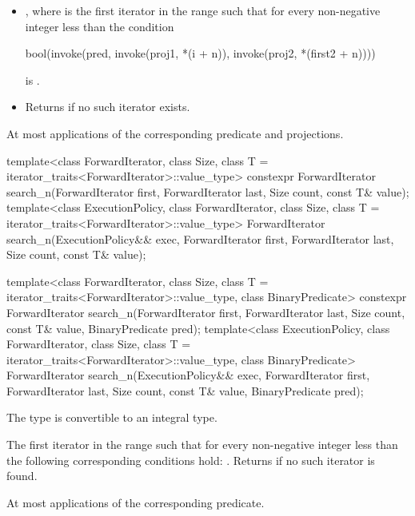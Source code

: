\begin{itemdescr}
\pnum
\returns
\begin{itemize}
\item
  ,
  where  is
  the first iterator in the range 
  such that
  for every non-negative integer  less than 
  the condition
\begin{codeblock}
bool(invoke(pred, invoke(proj1, *(i + n)), invoke(proj2, *(first2 + n))))
\end{codeblock}
  is .
\item
  Returns  if no such iterator exists.
\end{itemize}

\pnum
\complexity
At most  applications
of the corresponding predicate and projections.
\end{itemdescr}

%
\begin{itemdecl}
template<class ForwardIterator, class Size, class T = iterator_traits<ForwardIterator>::value_type>
  constexpr ForwardIterator
    search_n(ForwardIterator first, ForwardIterator last,
             Size count, const T& value);
template<class ExecutionPolicy, class ForwardIterator, class Size,
         class T = iterator_traits<ForwardIterator>::value_type>
  ForwardIterator
    search_n(ExecutionPolicy&& exec,
             ForwardIterator first, ForwardIterator last,
             Size count, const T& value);

template<class ForwardIterator, class Size, class T = iterator_traits<ForwardIterator>::value_type,
         class BinaryPredicate>
  constexpr ForwardIterator
    search_n(ForwardIterator first, ForwardIterator last,
             Size count, const T& value,
             BinaryPredicate pred);
template<class ExecutionPolicy, class ForwardIterator, class Size,
         class T = iterator_traits<ForwardIterator>::value_type,
         class BinaryPredicate>
  ForwardIterator
    search_n(ExecutionPolicy&& exec,
             ForwardIterator first, ForwardIterator last,
             Size count, const T& value,
             BinaryPredicate pred);
\end{itemdecl}

\begin{itemdescr}

\pnum
\mandates
The type 
is convertible to an integral type.

\pnum
\returns
The first iterator  in the range 
such that for every non-negative integer  less than 
the following corresponding conditions hold:
.
Returns  if no such iterator is found.

\pnum
\complexity
At most  applications of the corresponding predicate.
\end{itemdescr}

